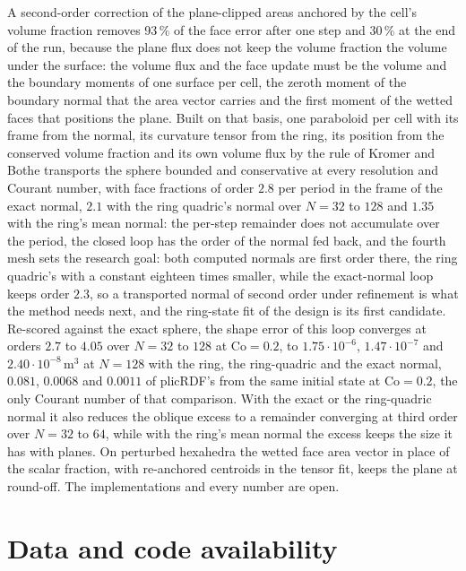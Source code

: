 \documentclass[preprint,12pt]{elsarticle}
\begin{document}
A second-order correction of the plane-clipped areas anchored by the cell's volume fraction removes 93\,\% of the face error after one step and 30\,\% at the end of the run, because the plane flux does not keep the volume fraction the volume under the surface: the volume flux and the face update must be the volume and the boundary moments of one surface per cell, the zeroth moment of the boundary normal that the area vector carries and the first moment of the wetted faces that positions the plane. Built on that basis, one paraboloid per cell with its frame from the normal, its curvature tensor from the ring, its position from the conserved volume fraction and its own volume flux by the rule of Kromer and Bothe transports the sphere bounded and conservative at every resolution and Courant number, with face fractions of order $2.8$ per period in the frame of the exact normal, $2.1$ with the ring quadric's normal over $N = 32$ to $128$ and $1.35$ with the ring's mean normal: the per-step remainder does not accumulate over the period, the closed loop has the order of the normal fed back, and the fourth mesh sets the research goal: both computed normals are first order there, the ring quadric's with a constant eighteen times smaller, while the exact-normal loop keeps order $2.3$, so a transported normal of second order under refinement is what the method needs next, and the ring-state fit of the design is its first candidate. Re-scored against the exact sphere, the shape error of this loop converges at orders $2.7$ to $4.05$ over $N = 32$ to $128$ at $\mathrm{Co} = 0.2$, to $1.75\cdot10^{-6}$, $1.47\cdot10^{-7}$ and $2.40\cdot10^{-8}\,\mathrm{m^3}$ at $N = 128$ with the ring, the ring-quadric and the exact normal, $0.081$, $0.0068$ and $0.0011$ of plicRDF's from the same initial state at $\mathrm{Co} = 0.2$, the only Courant number of that comparison. With the exact or the ring-quadric normal it also reduces the oblique excess to a remainder converging at third order over $N = 32$ to $64$, while with the ring's mean normal the excess keeps the size it has with planes. On perturbed hexahedra the wetted face area vector in place of the scalar fraction, with re-anchored centroids in the tensor fit, keeps the plane at round-off. The implementations and every number are open.

\section*{Data and code availability}
\label{sec:data}
\end{document}
